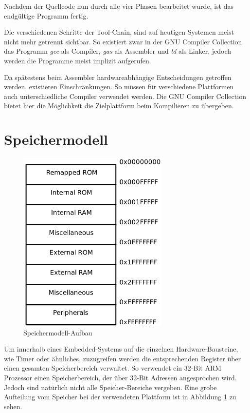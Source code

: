\documentclass[
  a4paper,					%
  twoside,
  DIV=calc,     				%
  bibliography=totoc,
  cleardoublepage=empty,
  ngerman,     					%
  final       					%
]{scrbook}
\begin{document}
Nachdem der Quellcode nun durch alle vier Phasen bearbeitet wurde, ist das endgültige Programm fertig.

Die verschiedenen Schritte der Tool-Chain, sind auf heutigen Systemen meist nicht mehr getrennt sichtbar. So existiert zwar in der GNU Compiler Collection das Programm \emph{gcc} als Compiler, \emph{gas} als Assembler und \emph{ld} als Linker, jedoch werden die Programme meist implizit aufgerufen.

Da spätestens beim Assembler hardwareabhängige Entscheidungen getroffen werden, existieren Einschränkungen. So müssen für verschiedene Plattformen auch unterschiedliche Compiler verwendet werden. Die GNU Compiler Collection bietet hier die Möglichkeit die Zielplattform beim Kompilieren zu übergeben.


\section{Speichermodell}
\label{sec:speichermodel}

\begin{figure}
\includegraphics[width=7.5cm]{MemoryMap}
\caption{Speichermodell-Aufbau}
\label{fig:speichermodel}
\end{figure}

Um innerhalb eines Embedded-Systems auf die einzelnen Hardware-Bausteine, wie Timer oder ähnliches, zuzugreifen werden die entsprechenden Register über einen gesamten Speicherbereich verwaltet. So verwendet ein 32-Bit ARM Prozessor einen Speicherbereich, der über 32-Bit Adressen angesprochen wird. Jedoch sind natürlich nicht alle Speicher-Bereiche vergeben. Eine grobe Aufteilung vom Speicher bei der verwendeten Plattform ist in Abbildung \ref{fig:speichermodel} zu sehen.
\end{document}
